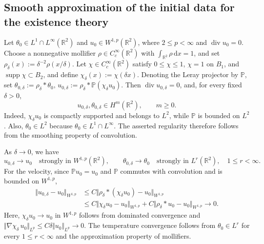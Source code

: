 \documentclass[reqno,11pt,a4paper]{amsart}
\newcommand{\dd}{\mathrm{d}}
\begin{document}
\subsection{Smooth approximation of the initial data
for the existence theory}\label{sec:A1}

Let $\theta_0\in L^1\cap L^\infty(\mathbb R^2)$
and $u_0\in W^{1,p}(\mathbb R^2)$,
where $2\leq p<\infty$ and $\operatorname{div}u_0=0$.
Choose a nonnegative mollifier
$\rho\in C_c^\infty(\mathbb R^2)$ with
$\int_{\mathbb R^2}\rho\,\dd x=1$, and set $\rho_\delta(x):=\delta^{-2}\rho(x/\delta)$. 
Let $\chi\in C_c^\infty(\mathbb R^2)$ satisfy
$0\leq\chi\leq1$, $\chi=1$ on $B_1$, and
$\operatorname{supp}\chi\subset B_2$,
and define $\chi_\delta(x):=\chi(\delta x)$.
Denoting the Leray projector by $\mathbb P$, set $\theta_{0,\delta}:=\rho_\delta*\theta_0,\,u_{0,\delta}:=\rho_\delta*\mathbb P(\chi_\delta u_0)$. 
Then $\operatorname{div}u_{0,\delta}=0$, and,
for every fixed $\delta>0$,
\[
  u_{0,\delta},\theta_{0,\delta}
  \in H^m(\mathbb R^2),
  \qquad m\geq0.
\]
Indeed, $\chi_\delta u_0$ is compactly supported
and belongs to $L^2$, while $\mathbb P$ is bounded
on $L^2$.
Also, $\theta_0\in L^2$ because
$\theta_0\in L^1\cap L^\infty$.
The asserted regularity therefore follows
from the smoothing property of convolution.

As $\delta\to0$, we have
\[
  u_{0,\delta}\longrightarrow u_0
  \quad\text{strongly in }W^{1,p}(\mathbb R^2),
  \qquad
  \theta_{0,\delta}\longrightarrow\theta_0
  \quad\text{strongly in }L^r(\mathbb R^2),
  \quad 1\leq r<\infty.
\]
For the velocity, since $\mathbb P u_0=u_0$
and $\mathbb P$ commutes with convolution
and is bounded on $W^{1,p}$,
\begin{align*}
  \Vert u_{0,\delta}-u_0\Vert _{W^{1,p}}
  &\leq
  C\Vert \rho_\delta*(\chi_\delta u_0)-u_0\Vert _{W^{1,p}}
  \\
  &\leq
  C\Vert \chi_\delta u_0-u_0\Vert _{W^{1,p}}
  +C\Vert \rho_\delta*u_0-u_0\Vert _{W^{1,p}}
  \longrightarrow0.
\end{align*}
Here, $\chi_\delta u_0\to u_0$ in $W^{1,p}$
follows from dominated convergence and
$\Vert \nabla\chi_\delta\,u_0\Vert _{L^p}\leq C\delta\Vert u_0\Vert _{L^p}\longrightarrow 0$.
The temperature convergence follows from
$\theta_0\in L^r$ for every $1\leq r<\infty$
and the approximation property of mollifiers.
\end{document}
